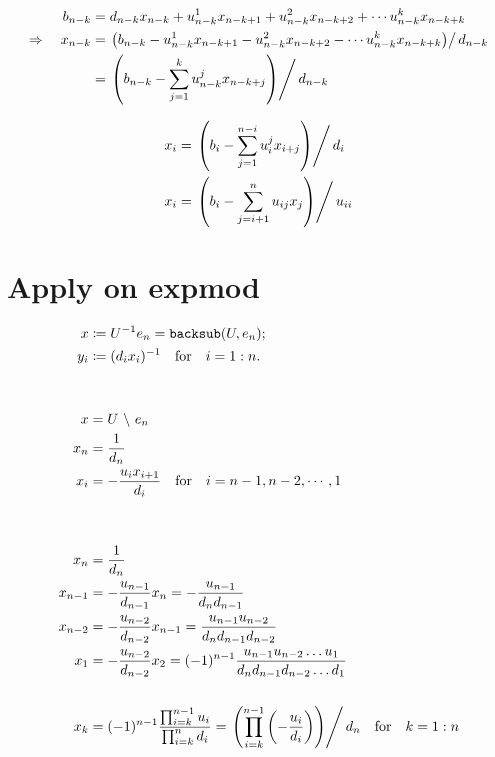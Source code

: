 \documentclass[11pt]{article}
\begin{document}
\begin{align}
    b_{n-k} &= d_{n-k} x_{n-k}+u_{n-k}^{1} x_{n-k+1}+u_{n-k}^{2} x_{n-k+2} + \cdots u_{n-k}^{k} x_{n-k+k}\\
    \Rightarrow \quad x_{n-k} &= \left.\left(b_{n-k}-u_{n-k}^{1} x_{n-k+1}-u_{n-k}^{2} x_{n-k+2} - \cdots
        u_{n-k}^{k} x_{n-k+k}\right) \right/ d_{n-k}\\
        &= \left.\left(b_{n-k}-\sum_{j=1}^{k} u_{n-k}^{j} x_{n-k+j}\right) \right/ d_{n-k} \\
\end{align}


\begin{align}
    x_{i} &= \left.\left(b_{i}-\sum_{j=1}^{n-i} u_{i}^{j} x_{i+j}\right) \right/ d_{i} \\
    x_{i} &= \left.\left(b_{i}-\sum_{j=i+1}^{n} u_{i j} x_{j}\right) \right/ u_{i i}
\end{align}



\newpage

\section{Apply on expmod}

\begin{align*}
    x &\coloneqq U^{-1} e_n = \texttt{backsub}(U, e_n); \\
    y_{i} &\coloneqq (d_{i} x_{i})^{-1} \qfor i=1:n.\\
    \\
    \\
    x &= U \ \backslash \ e_n\\
    x_n &= \frac{1}{d_n}\\
    x_i &= -\frac{u_i x_{i+1}}{d_i} \qfor i=n-1, n-2, \cdots, 1\\
    \\
    \\
    x_n &= \frac{1}{d_{n}}\\
    x_{n-1} &=-\frac{u_{n-1}}{d_{n-1}} x_n = -\frac{u_{n-1}}{d_n d_{n-1}} \\
    x_{n-2} &=-\frac{u_{n-2}}{d_{n-2}} x_{n-1} = \frac{u_{n-1} u_{n-2}}{d_n d_{n-1} d_{n-2}} \\
    x_{1} &=-\frac{u_{n-2}}{d_{n-2}} x_{2} = (-1)^{n-1} \frac{u_{n-1} u_{n-2} \dots u_{1}}{d_n d_{n-1} d_{n-2} \dots d_{1}} \\
    \\
    x_k &= (-1)^{n-1} \frac{\prod_{i=k}^{n-1} u_i}{\prod_{i=k}^n d_i} = \left.\left(\prod_{i=k}^{n-1}\left(-\frac{u_i}{d_i}\right)\right) \right/ d_n \qfor k = 1:n\\
\end{align*}
\end{document}
